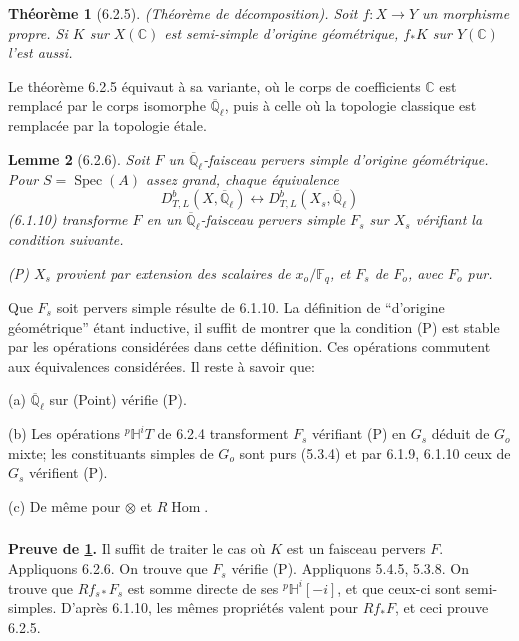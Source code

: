\documentclass[12pt,a4paper]{article}
\theoremstyle{plain}
\newtheorem{theorem}{Th\'eor\`eme}[section]
\newtheorem{lemma}[theorem]{Lemme}
\theoremstyle{definition}
\theoremstyle{remark}
\DeclareMathOperator{\Hom}{Hom}
\DeclareMathOperator{\Spec}{Spec}
\newcommand{\CC}{\mathbb{C}}
\newcommand{\FF}{\mathbb{F}}
\newcommand{\HH}{\mathbb{H}}
\newcommand{\QQ}{\mathbb{Q}}
\begin{document}
\begin{theorem}[6.2.5]\label{thm:6.2.5}(Th\'eor\`eme de d\'ecomposition).
Soit $f: X \to Y$ un morphisme propre. Si $K$ sur $X(\CC)$ est semi-simple d'origine g\'eom\'etrique, $f_*K$ sur $Y(\CC)$ l'est aussi.
\end{theorem}

Le th\'eor\`eme 6.2.5 \'equivaut \`a sa variante, o\`u le corps de coefficients $\CC$ est remplac\'e par le corps isomorphe $\overline{\QQ}_{\ell}$, puis \`a celle o\`u la topologie classique est remplac\'ee par la topologie \'etale.

\begin{lemma}[6.2.6]
Soit $F$ un $\overline{\QQ}_{\ell}$-faisceau pervers simple d'origine g\'eom\'etrique. Pour $S = \Spec(A)$ assez grand, chaque \'equivalence
\[
D^b_{T, L}(X, \overline{\QQ}_{\ell}) \longleftrightarrow D^b_{T, L}(X_s, \overline{\QQ}_{\ell})
\]
(6.1.10) transforme $F$ en un $\overline{\QQ}_{\ell}$-faisceau pervers simple $F_s$ sur $X_s$ v\'erifiant la condition suivante.

\emph{(P)} $X_s$ provient par extension des scalaires de $x_o/\FF_q$, et $F_s$ de $F_o$, avec $F_o$ pur.
\end{lemma}

Que $F_s$ soit pervers simple r\'esulte de 6.1.10. La d\'efinition de ``d'origine g\'eom\'etrique'' \'etant inductive, il suffit de montrer que la condition (P) est stable par les op\'erations consid\'er\'ees dans cette d\'efinition. Ces op\'erations commutent aux \'equivalences consid\'er\'ees. Il reste \`a savoir que:

(a) $\overline{\QQ}_{\ell}$ sur (Point) v\'erifie (P).

(b) Les op\'erations ${}^{p}\HH^iT$ de 6.2.4 transforment $F_s$ v\'erifiant (P) en $G_s$ d\'eduit de $G_o$ mixte; les constituants simples de $G_o$ sont purs (5.3.4) et par 6.1.9, 6.1.10 ceux de $G_s$ v\'erifient (P).

(c) De m\^eme pour $\otimes$ et $R\Hom$.

\subsubsection{}
\textbf{Preuve de \ref{thm:6.2.5}.} Il suffit de traiter le cas o\`u $K$ est un faisceau pervers $F$. Appliquons 6.2.6. On trouve que $F_s$ v\'erifie (P). Appliquons 5.4.5, 5.3.8. On trouve que $Rf_{s*}F_s$ est somme directe de ses ${}^{p}\HH^i[-i]$, et que ceux-ci sont semi-simples. D'apr\`es 6.1.10, les m\^emes propri\'et\'es valent pour $Rf_*F$, et ceci prouve 6.2.5.
\end{document}
